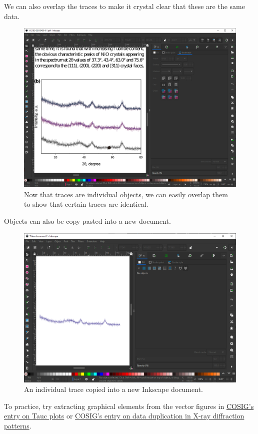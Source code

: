 \documentclass[letterpaper, 12pt]{article}
\begin{document}
\pagebreak
We can also overlap the traces to make it crystal clear that these are the same data.

\begin{figure}[h!tbp]
    \includegraphics[width=\textwidth]{img/vector/in_inkscape_individual_traces_thinned_overlapping.png}
    \caption*{Now that traces are individual objects, we can easily overlap them to show that certain traces are identical.}
\end{figure}

\pagebreak
Objects can also be copy-pasted into a new document.

\begin{figure}[h!tbp]
    \includegraphics[width=\textwidth]{img/vector/inkscape_new_document.png}
    \caption*{ An individual trace copied into a new Inkscape document.}
\end{figure}

To practice, try extracting graphical elements from the vector figures in \href{https://osf.io/gpxvf}{COSIG's entry on Tauc plots} or \href{https://osf.io/685xa}{COSIG's entry on data duplication in X-ray diffraction patterns}.
\end{document}
